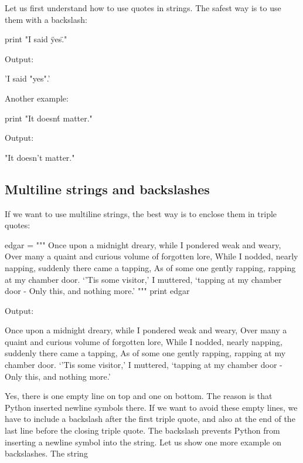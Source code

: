 Let us first understand how to use quotes in strings. The safest way is to use 
them with a backslash:

\begin{bluecode}
print "I said \"yes\"."
\end{bluecode}
Output:

\begin{greencode}
'I said "yes".'
\end{greencode}
Another example:

\begin{bluecode}
print "It doesn\'t matter."
\end{bluecode}
Output:

\begin{greencode}
"It doesn't matter."
\end{greencode}

\subsection{Multiline strings and backslashes}

If we want to use multiline strings, the best way is to enclose them 
in triple quotes: 

\begin{bluecode}
edgar = """
Once upon a midnight dreary, while I pondered weak and weary,
Over many a quaint and curious volume of forgotten lore,
While I nodded, nearly napping, suddenly there came a tapping,
As of some one gently rapping, rapping at my chamber door.
`'Tis some visitor,' I muttered, `tapping at my chamber door -
Only this, and nothing more.'
"""
print edgar
\end{bluecode}
Output:

\begin{greencode}

Once upon a midnight dreary, while I pondered weak and weary,
Over many a quaint and curious volume of forgotten lore,
While I nodded, nearly napping, suddenly there came a tapping,
As of some one gently rapping, rapping at my chamber door.
`'Tis some visitor,' I muttered, `tapping at my chamber door -
Only this, and nothing more.'

\end{greencode}
Yes, there is one empty line on top and one on bottom. The reason is that 
Python inserted newline symbols there. If we want to avoid these empty lines, 
we have to include a backslash after the first triple quote, and also at the 
end of the last line before the closing triple quote. The backslash prevents 
Python from inserting a newline symbol into the string. Let us show one more 
example on backslashes. The string 

